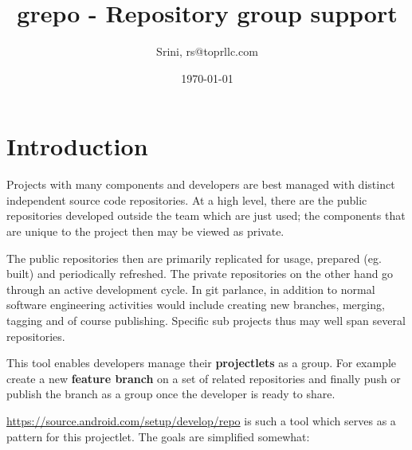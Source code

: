 \documentclass[11pt, a4paper]{article} %
\title{grepo - Repository group support} %
\author{Srini, rs@toprllc.com}
\date{\small \today} %
\begin{document}

%

\maketitle %

\setcounter{page}{1} %

\section{Introduction} %

Projects with many components and developers are best managed with distinct independent source code repositories. At a high level, there are
the public repositories developed outside the team which are just used; the components that are unique to the project then may be viewed as 
private.

The public repositories then are primarily replicated for usage, prepared (eg. built) and periodically refreshed. The private repositories on the other hand go through an active development cycle. In git parlance, in addition to normal software engineering activities would include creating new branches, merging, tagging and of course publishing. Specific sub projects thus may well span several repositories.

This tool enables developers manage their \textbf{projectlets} as a group. For example create a new \textbf{feature branch} on a set of related repositories and finally push or publish the branch as a group once the developer is ready to share.

\url{https://source.android.com/setup/develop/repo} is such a tool which serves as a pattern for this projectlet. The goals are simplified somewhat:
\end{document}
